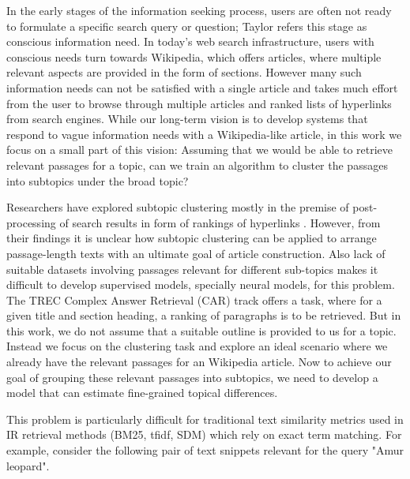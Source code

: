 In the early stages of the information seeking process, users are often not ready to formulate a specific search query or question; Taylor\cite{taylor2015question} refers this stage as conscious information need. In today's web search infrastructure, users with conscious needs turn towards Wikipedia, which offers articles, where multiple relevant aspects are provided in the form of sections. However many such information needs can not be satisfied with a single article and takes much effort from the user to browse through multiple articles and ranked lists of hyperlinks from search engines. While our long-term vision is to develop systems that respond to vague information needs with a Wikipedia-like article, in this work we focus on a small part of this vision: Assuming that we would be able to retrieve relevant passages for a topic, can we train an algorithm to cluster the passages into subtopics under the broad topic? \par
Researchers have explored subtopic clustering mostly in the premise of post-processing of search results in form of rankings of hyperlinks \cite{bernardini2009full, carpineto2012evaluating}. However, from their findings it is unclear how subtopic clustering can be applied to arrange passage-length texts with an ultimate goal of article construction. Also lack of suitable datasets involving passages relevant for different sub-topics makes it difficult to develop supervised models, specially neural models, for this problem. The TREC Complex Answer Retrieval (CAR) \cite{dietz2017trec} track offers a task, where for a given title and section heading, a ranking of paragraphs is to be retrieved. But in this work, we do not assume that a suitable outline is provided to us for a topic. Instead we focus on the clustering task and explore an ideal scenario where we already have the relevant passages for an Wikipedia article. Now to achieve our goal of grouping these relevant passages into subtopics, we need to develop a model that can estimate fine-grained topical differences.

This problem is particularly difficult for traditional text similarity metrics used in IR retrieval methods (BM25, tfidf, SDM) which rely on exact term matching. For example, consider the following pair of text snippets relevant for the query "Amur leopard".

\noindent{}
\noindent{}

